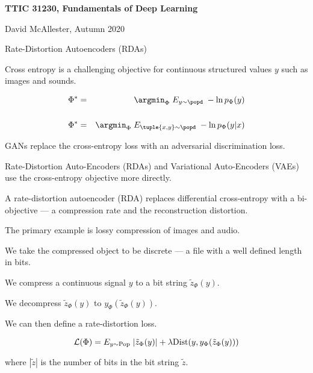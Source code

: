 





{\Huge

  \centerline{\bf TTIC 31230, Fundamentals of Deep Learning}
  \bigskip
  \centerline{David McAllester, Autumn 2020}
  \vfill
  \centerline{Rate-Distortion Autoencoders (RDAs)}
  \vfill
  \vfill


Cross entropy is a challenging objective for continuous structured values $y$ such as images and sounds.

\vfill
\begin{eqnarray*}
\Phi^* & = & \argmin_\Phi \;E_{y \sim \popd}\;-\ln p_\Phi(y) \\
\\
\Phi^* & = & \argmin_\Phi \;E_{\tuple{x,y} \sim \popd}\;-\ln p_\Phi(y|x)
\end{eqnarray*}

\vfill
GANs replace the cross-entropy loss with an adversarial discrimination loss.

\vfill
Rate-Distortion Auto-Encoders (RDAs) and Variational Auto-Encoders (VAEs) use the cross-entropy objective more directly.


A rate-distortion autoencoder (RDA) replaces differential cross-entropy with a bi-objective --- a compression rate and
the reconstruction distortion.

\vfill
The primary example is lossy compression of images and audio.

\vfill
We take the compressed object to be discrete --- a file with a well defined length in bits.


We compress a continuous signal $y$ to a bit string $\tilde{z}_\Phi(y)$.

\vfill
We decompress $\tilde{z}_\Phi(y)$ to $y_\Phi(\tilde{z}_\Phi(y))$.

\vfill
We can then define a rate-distortion loss.

{\color{red} $${\cal L}(\Phi) = E_{y \sim \mathrm{Pop}}\;|\tilde{z}_\Phi(y)| + \lambda \mathrm{Dist}(y,y_\Phi(\tilde{z}_\Phi(y)))$$}

\vfill
where $|\tilde{z}|$ is the number of bits in the bit string $\tilde{z}$.


}
